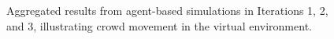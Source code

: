 \begin{figure}[H]
	\makebox[\linewidth][c]{%
		
	}
	\caption*{%
		Aggregated results from agent-based simulations in Iterations 1, 2, and 3, illustrating crowd movement in the virtual environment.
	}
	\label{
		fig:x-transit-hub--abm-superimpose
	}
\end{figure}
